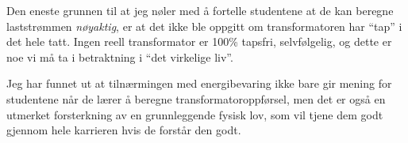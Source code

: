 
Den eneste grunnen til at jeg nøler med å fortelle studentene at de kan beregne laststrømmen {\it nøyaktig}, er at det ikke ble oppgitt om transformatoren har ``tap'' i det hele tatt. Ingen reell transformator er 100\% tapsfri, selvfølgelig, og dette er noe vi må ta i betraktning i ``det virkelige liv''.

Jeg har funnet ut at tilnærmingen med energibevaring ikke bare gir mening for studentene når de lærer å beregne transformatoroppførsel, men det er også en utmerket forsterkning av en grunnleggende fysisk lov, som vil tjene dem godt gjennom hele karrieren hvis de forstår den godt.


